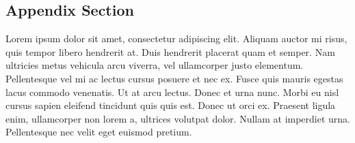\documentclass[
	a4paper, %
	11pt, %
]{DC_Report}
\begin{document}
\begin{appendices}
\section{Appendix Section}

Lorem ipsum dolor sit amet, consectetur adipiscing elit. Aliquam auctor mi risus, quis tempor libero hendrerit at. Duis hendrerit placerat quam et semper. Nam ultricies metus vehicula arcu viverra, vel ullamcorper justo elementum. Pellentesque vel mi ac lectus cursus posuere et nec ex. Fusce quis mauris egestas lacus commodo venenatis. Ut at arcu lectus. Donec et urna nunc. Morbi eu nisl cursus sapien eleifend tincidunt quis quis est. Donec ut orci ex. Praesent ligula enim, ullamcorper non lorem a, ultrices volutpat dolor. Nullam at imperdiet urna. Pellentesque nec velit eget euismod pretium.

\end{appendices}

\end{document}
